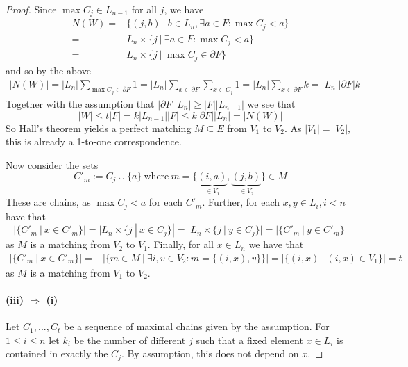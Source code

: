 \documentclass{scrartcl}
\theoremstyle{definition}
\begin{document}
\begin{proof}
    Since $\max C_j \in L_{n - 1}$ for all $j$, we have
    \begin{align*}
        N(W) =& \{ (j, b) \ | \ b \in L_n, \exists a \in F: \max C_j < a \} \\
        =& L_n \times \{ j \ | \ \exists a \in F: \max C_j < a \} \\
        =& L_n \times \{ j \ | \ \max C_j \in \partial F \}
    \end{align*}
    and so by the above
    \begin{align*}
        |N(W)| = |L_n| \sum_{\max C_j \in \partial F} 1 = |L_n| \sum_{x \in \partial F} \sum_{x \in C_j} 1 = |L_n| \sum_{x \in \partial F} k = |L_n| |\partial F| k
    \end{align*}
    Together with the assumption that $|\partial F| |L_n| \geq |F| |L_{n - 1}|$ we see that
    \begin{equation*}
        |W| \leq t |F| = k |L_{n - 1}| |F| \leq k |\partial F| |L_n| = |N(W)|
    \end{equation*}
    So Hall's theorem yields a perfect matching $M \subseteq E$ from $V_1$ to $V_2$.
    As $|V_1| = |V_2|$, this is already a 1-to-one correspondence.

    Now consider the sets
    \begin{equation*}
        C'_m := C_j \cup \{ a \} \ \text{where} \ m = \{\underbrace{(i, a)}_{\in V_1}, \underbrace{(j, b)}_{\in V_2}\} \in M
    \end{equation*}
    These are chains, as $\max C_j < a$ for each $C'_m$.
    Further, for each $x, y \in L_i, i < n$ have that
    \begin{equation*}
        |\{ C'_m \ | \ x \in C'_m \}| = |L_n \times \{ j \ | \ x \in C_j \}| = |L_n \times \{ j \ | \ y \in C_j \}| = |\{ C'_m \ | \ y \in C'_m \}|
    \end{equation*}
    as $M$ is a matching from $V_2$ to $V_1$.
    Finally, for all $x \in L_n$ we have that
    \begin{align*}
        |\{ C'_m \ | \ x \in C'_m \}| =& |\{ m \in M \ | \ \exists i, v \in V_2: m = \{ (i, x), v \} \}| = |\{ (i, x) \ | \ (i, x) \in V_1 \}| = t
    \end{align*}
    as $M$ is a matching from $V_1$ to $V_2$.

    \paragraph{(iii) $\Rightarrow$ (i)} Let $C_1, ..., C_t$ be a sequence of maximal chains given by the assumption.
    For $1 \leq i \leq n$ let $k_i$ be the number of different $j$ such that a fixed element $x \in L_i$ is contained in exactly the $C_j$.
    By assumption, this does not depend on $x$.


\end{proof}
\end{document}
